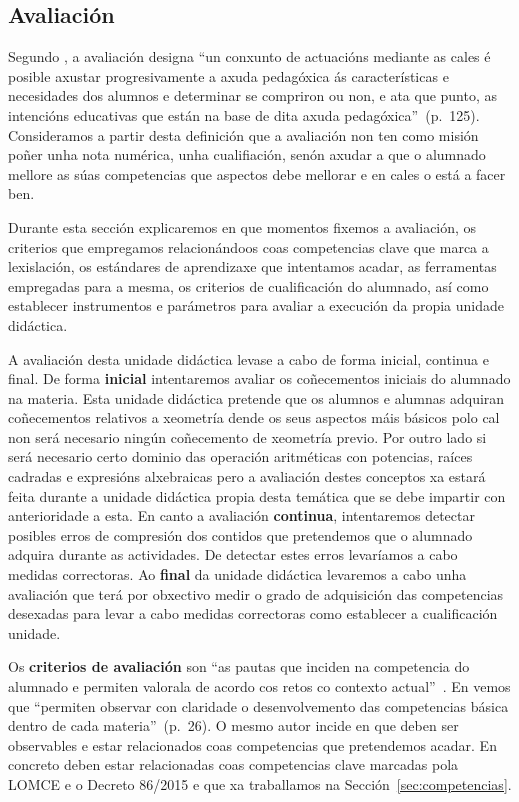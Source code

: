 \subsection{Avaliación}\label{sec:avaliacion}

Segundo , a avaliación designa ``un conxunto de actuacións mediante as cales é posible axustar progresivamente a axuda pedagóxica ás características e necesidades dos alumnos e determinar se compriron ou non, e ata que punto, as intencións educativas que están na base de dita axuda pedagóxica''~(p.~125). Consideramos a partir desta definición que a avaliación non ten como misión poñer unha nota numérica, unha cualifiación, senón axudar a que o alumnado mellore as súas competencias que aspectos debe mellorar e en cales o está a facer ben.

Durante esta sección explicaremos en que momentos fixemos a avaliación, os criterios que empregamos relacionándoos coas competencias clave que marca a lexislación, os estándares de aprendizaxe que intentamos acadar, as ferramentas empregadas para a mesma, os criterios de cualificación do alumnado, así como establecer instrumentos e parámetros para avaliar a execución da propia unidade didáctica.

A avaliación desta unidade didáctica levase a cabo de forma inicial, continua e final. De forma \textbf{inicial} intentaremos avaliar os coñecementos iniciais do alumnado na materia. Esta unidade didáctica pretende que os alumnos e alumnas adquiran coñecementos relativos a xeometría dende os seus aspectos máis básicos polo cal non será necesario ningún coñecemento de xeometría previo. Por outro lado si será necesario certo dominio das operación aritméticas con potencias, raíces cadradas e expresións alxebraicas pero a avaliación destes conceptos xa estará feita durante a unidade didáctica propia desta temática que se debe impartir con anterioridade a esta. En canto a avaliación \textbf{continua}, intentaremos detectar posibles erros de compresión dos contidos que pretendemos que o alumnado adquira durante as actividades. De detectar estes erros levaríamos a cabo medidas correctoras. Ao \textbf{final} da unidade didáctica levaremos a cabo unha avaliación que terá por obxectivo medir o grado de adquisición das competencias desexadas para levar a cabo medidas correctoras como establecer a cualificación unidade.

Os \textbf{criterios de avaliación} son ``as pautas que inciden na competencia do alumnado e permiten valorala de acordo cos retos co contexto actual''~\cite[p. 134]{secdidac}. En \cite{orientacionesgobvasco} vemos que ``permiten observar con claridade o desenvolvemento das competencias básica dentro de cada materia''~(p.~26). O mesmo autor incide en que deben ser observables e estar relacionados coas competencias que pretendemos acadar. En concreto deben estar relacionadas coas competencias clave marcadas pola LOMCE e o Decreto 86/2015 e que xa traballamos na Sección~\ref{sec:competencias}.

